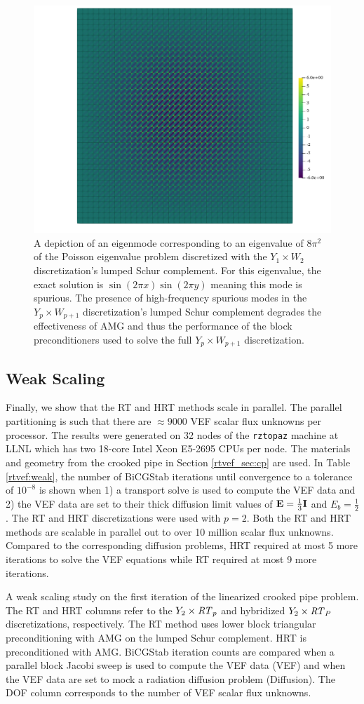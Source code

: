 \documentclass[../doc.tex]{subfiles}
\begin{document}
\begin{figure}
\centering
\includegraphics[width=.5\textwidth]{data/img/badmode40.png}
\caption{A depiction of an eigenmode corresponding to an eigenvalue of $8\pi^2$ of the Poisson eigenvalue problem discretized with the $Y_1\times W_2$ discretization's lumped Schur complement. For this eigenvalue, the exact solution is $\sin(2\pi x)\sin(2\pi y)$ meaning this mode is spurious. The presence of high-frequency spurious modes in the $Y_p\times W_{p+1}$ discretization's lumped Schur complement degrades the effectiveness of AMG and thus the performance of the block preconditioners used to solve the full $Y_p\times W_{p+1}$ discretization.}
\label{rtvef:badmode}
\end{figure}

\subsection{Weak Scaling}
Finally, we show that the RT and HRT methods scale in parallel. The parallel partitioning is such that there are $\approx\!\num{9000}$ VEF scalar flux unknowns per processor. The results were generated on 32 nodes of the \texttt{rztopaz} machine at LLNL which has two 18-core Intel Xeon E5-2695 CPUs per node. The materials and geometry from the crooked pipe in Section \ref{rtvef_sec:cp} are used. In Table \ref{rtvef:weak}, the number of BiCGStab iterations until convergence to a tolerance of $10^{-8}$ is shown when 1) a transport solve is used to compute the VEF data and 2) the VEF data are set to their thick diffusion limit values of $\boldsymbol{\mathrm{E}} = \frac{1}{3}\boldsymbol{\mathrm{I}}$ and $E_b = \frac{1}{2}$. The RT and HRT discretizations were used with $p=2$. Both the RT and HRT methods are scalable in parallel out to over 10 million scalar flux unknowns. Compared to the corresponding diffusion problems, HRT required at most 5 more iterations to solve the VEF equations while RT required at most 9 more iterations. 
\begin{table}
\centering
\caption{A weak scaling study on the first iteration of the linearized crooked pipe problem. The RT and HRT columns refer to the $Y_2\times \mathit{RT}_p$ and hybridized $Y_2\times \mathit{RT}_P$ discretizations, respectively. The RT method uses lower block triangular preconditioning with AMG on the lumped Schur complement. HRT is preconditioned with AMG. BiCGStab iteration counts are compared when a parallel block Jacobi sweep is used to compute the VEF data (VEF) and when the VEF data are set to mock a radiation diffusion problem (Diffusion). The DOF column corresponds to the number of VEF scalar flux unknowns.}
\label{rtvef:weak}

\end{table}
\end{document}
